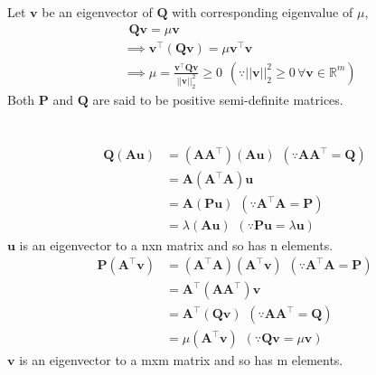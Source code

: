 \documentclass{article}
\begin{document}
Let $\bm{v}$ be an eigenvector of $\bm{Q}$ with corresponding eigenvalue of $\mu$,
\begin{align*}
    &\hspace{5pt}\bm{Q}\bm{v} = \mu \bm{v}\\
    &\implies \bm{v}^\intercal(\bm{Q}\bm{v}) = \mu \bm{v}^\intercal\bm{v}\\
    &\implies \mu =\frac{\bm{v}^\intercal\bm{Q}\bm{v}}{\lvert\lvert\bm{v} \rvert\rvert_2^2} \geq 0 \hspace{5pt}(\because \lvert\lvert\bm{v} \rvert\rvert_2^2 \geq 0 \hspace{2pt}\forall \bm{v} \in \mathbb{R}^m)
\end{align*}
Both $\bm{P}$ and $\bm{Q}$ are said to be positive semi-definite matrices. \\

\raggedright
\section{}
\begin{align*}
    \bm{Q}(\bm{Au}) &= (\bm{A} \bm{A}^\intercal)(\bm{A}\bm{u}) \hspace{5pt}(\because \bm{A}\bm{A}^\intercal = \bm{Q})\\
    &= \bm{A} (\bm{A}^\intercal \bm{A})\bm{u}\\
    &= \bm{A}(\bm{P}\bm{u}) \hspace{5pt}(\because \bm{A}^\intercal \bm{A} = \bm{P})\\
    &= \lambda (\bm{A}\bm{u}) \hspace{5pt}(\because \bm{P}\bm{u} = \lambda \bm{u})
\end{align*}
$\bm{u}$ is an eigenvector to a nxn matrix and so has n elements.
\begin{align*}
    \bm{P}(\bm{A}^\intercal\bm{v}) &= (\bm{A}^\intercal\bm{A}) (\bm{A}^\intercal\bm{v}) \hspace{5pt}(\because \bm{A}^\intercal\bm{A} = \bm{P})\\
    &= \bm{A}^\intercal (\bm{A}\bm{A}^\intercal)\bm{v}\\
    &= \bm{A}^\intercal(\bm{Q}\bm{v}) \hspace{5pt}(\because \bm{A}\bm{A}^\intercal = \bm{Q})\\
    &= \mu (\bm{A}^\intercal\bm{v}) \hspace{5pt}(\because \bm{Q}\bm{v} = \mu \bm{v})
\end{align*}
$\bm{v}$ is an eigenvector to a mxm matrix and so has m elements.\\
\end{document}
